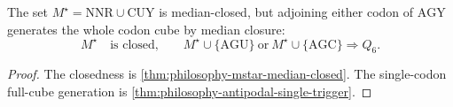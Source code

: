 \begin{theorem}
\label{thm:philosophy-antipodal-triggering-beyond-radial-shell}
The set $M^{\star}=\mathrm{NNR}\cup\mathrm{CUY}$ is median-closed, but
adjoining either codon of $\mathrm{AGY}$ generates the whole codon cube
by median closure:
$$
  M^{\star}
  \quad\text{is closed,}\qquad
  M^{\star}\cup\{\mathrm{AGU}\}
  \ \text{or}\
  M^{\star}\cup\{\mathrm{AGC}\}
  \Longrightarrow Q_{6}.
$$
\end{theorem}
\begin{proof}
The closedness is \autoref{thm:philosophy-mstar-median-closed}. The
single-codon full-cube generation is
\autoref{thm:philosophy-antipodal-single-trigger}.
\end{proof}

